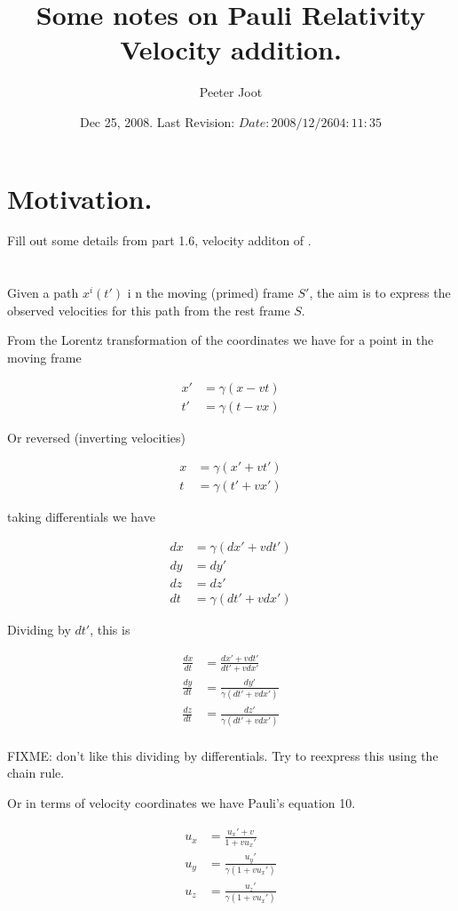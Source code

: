 \documentclass{article}
\title{ Some notes on Pauli Relativity Velocity addition. }
\author{Peeter Joot}
\date{ Dec 25, 2008.  Last Revision: $Date: 2008/12/26 04:11:35 $ }
\begin{document}
\maketitle{}
%

\section{ Motivation. }

Fill out some details from part 1.6, velocity additon of \cite{pauli1981tr}.

\section{ }

Given a path $x^i(t')$ i n the moving (primed) frame $S'$, the aim is to 
express the observed velocities for this path from the rest frame $S$.

From the Lorentz transformation of the coordinates we have for a point in the moving frame

\begin{align*}
x' &= \gamma ( x - vt) \\
t' &= \gamma ( t - vx)
\end{align*}

Or reversed (inverting velocities)

\begin{align*}
x &= \gamma ( x' + vt') \\
t &= \gamma ( t' + vx')
\end{align*}

taking differentials we have

\begin{align*}
dx &= \gamma ( dx' + v dt') \\
dy &= dy' \\
dz &= dz' \\
dt &= \gamma ( dt' + v dx')
\end{align*}

Dividing by $dt'$, this is

\begin{align*}
\frac{dx}{dt} &= \frac{ dx' + v dt' }{ dt' + v dx'} \\
\frac{dy}{dt} &= \frac{dy'}{\gamma (dt' + v dx')} \\
\frac{dz}{dt} &= \frac{dz'}{\gamma (dt' + v dx')} \\
\end{align*}

FIXME: don't like this dividing by differentials.  Try to reexpress this 
using the chain rule.

Or in terms of velocity coordinates we have Pauli's equation 10.

\begin{align*}
u_x &= \frac{ {u_x}' + v  }{ 1 + v {u_x}'} \\
u_y &= \frac{{u_y}'}{\gamma (1 + v {u_x}')} \\
u_z &= \frac{{u_z}'}{\gamma (1 + v {u_x}')} \\
\end{align*}



\end{document}

